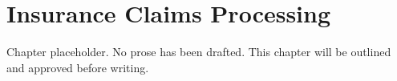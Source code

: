 \chapter{Insurance Claims Processing}
\begin{notebox}
Chapter placeholder. No prose has been drafted. This chapter will be outlined and approved before writing.
\end{notebox}

